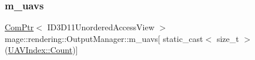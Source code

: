 \hypertarget{classmage_1_1rendering_1_1_output_manager_abfdf92e89ef4ee4df40204e84098fdd7}{}\label{classmage_1_1rendering_1_1_output_manager_abfdf92e89ef4ee4df40204e84098fdd7} 
\subsubsection{\texorpdfstring{m\+\_\+uavs}{m\_uavs}}
{\footnotesize\ttfamily \hyperlink{namespacemage_ae74f374780900893caa5555d1031fd79}{Com\+Ptr}$<$ I\+D3\+D11\+Unordered\+Access\+View $>$ mage\+::rendering\+::\+Output\+Manager\+::m\+\_\+uavs\mbox{[} static\+\_\+cast$<$ size\+\_\+t $>$(\hyperlink{classmage_1_1rendering_1_1_output_manager_a71b3797fef957312f92736f15b7ada3eae93f994f01c537c4e2f7d8528c3eb5e9}{U\+A\+V\+Index\+::\+Count})\mbox{]}\hspace{0.3cm}{\ttfamily [private]}}

